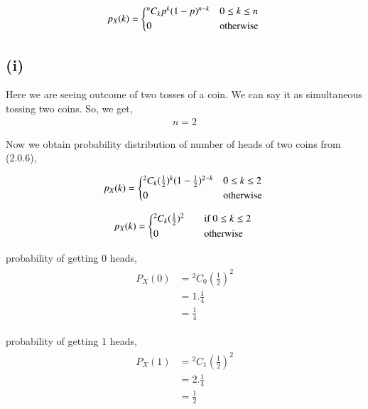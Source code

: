\documentclass[journal,12pt,twocolumn]{IEEEtran}
\begin{document}
\begin{align}
   p_X(k) =
  \begin{cases*}
    {^n C_k}p^{k}(1-p)^{n-k} & $0 \leq k \leq n$\\
      0 & otherwise
  \end{cases*}
\end{align}

\subsection{(i)}

Here we are seeing outcome of two tosses of a coin. We can say it as simultaneous tossing two coins. So, we get,
\begin{align}
    n=2
\end{align}

Now we obtain probability distribution of number of heads of two coins from (2.0.6),

\begin{align*}
   p_X(k) =
  \begin{cases*}
    {^2 C_k}(\frac{1}{2})^{k}(1-\frac{1}{2})^{2-k} & $0 \leq k \leq 2$\\
    0 & otherwise
  \end{cases*}
\end{align*}

\begin{align}
   p_X(k) =
  \begin{cases*}
    {^2 C_k}(\frac{1}{2})^{2} \quad& if $0 \leq k \leq 2$ \\
    0 \quad& otherwise
  \end{cases*}
\end{align}

probability of getting 0 heads,
\begin{align}
    \begin{split}
    P_X(0) &= {^2C_0}(\frac{1}{2})^2\\
    &=1.\frac{1}{4}\\
    &=\frac{1}{4}
    \end{split}
\end{align}

probability of getting 1 heads,
\begin{align}
    \begin{split}
    P_X(1) &= {^2C_1}(\frac{1}{2})^2\\
    &=2.\frac{1}{4}\\
    &=\frac{1}{2}
    \end{split}
\end{align}
\end{document}
